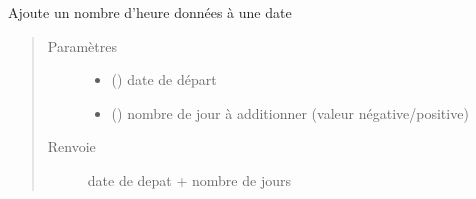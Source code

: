 \documentclass[letterpaper,10pt,french]{sphinxmanual}
\begin{document}

\begin{fulllineitems}
\label{\detokenize{modules/dtemng:toolbox.dtemng.timeadd}}
Ajoute un nombre d’heure données à une date
\begin{quote}\begin{description}
\item[{Paramètres}] \leavevmode\begin{itemize}
\item {} 
 () \textendash{} date de départ

\item {} 
 () \textendash{} nombre de jour à additionner (valeur négative/positive)

\end{itemize}

\item[{Renvoie}] \leavevmode
date de depat + nombre de jours

\end{description}\end{quote}

\end{fulllineitems}

\end{document}
